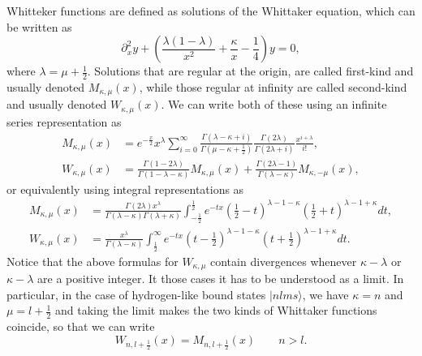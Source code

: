 Whitteker functions are defined as solutions of the Whittaker equation, which can be written as~\cite{bams}
\begin{equation}
    \partial_x^2 y + \left(\frac{\lambda(1-\lambda)}{x^2}+\frac{\kappa}{x}-\frac{1}{4}\right) y = 0,
\end{equation}
where $\lambda = \mu+\frac{1}{2}$.
Solutions that are regular at the origin, are called first-kind and usually denoted $M_{\kappa,\mu}(x)$, while those regular at infinity are called second-kind and usually denoted $W_{\kappa,\mu}(x)$. We can write both of these using an infinite series representation as
\begin{subequations} \label{WhittakerDefEq}
\begin{align}
    M_{\kappa,\mu}(x) &= e^{-\frac{x}{2}}x^{\lambda}\sum_{i=0}^\infty\frac{\Gamma(\lambda-\kappa+i)}{\Gamma(\mu-\kappa+\frac{1}{2})}\frac{\Gamma(2\lambda)}{\Gamma(2\lambda+i)}\frac{x^{i+\lambda}}{i!},
    \\
    W_{\kappa,\mu}(x) &= \frac{\Gamma(1-2\lambda)}{\Gamma(1-\lambda-\kappa)}M_{\kappa,\mu}(x)+\frac{\Gamma(2\lambda-1)}{\Gamma(\lambda-\kappa)}M_{\kappa,-\mu}(x),
\end{align}
\end{subequations}
or equivalently using integral representations as~\cite{AS}
\begin{subequations}
\begin{align}
    M_{\kappa,\mu}(x) &= \frac{\Gamma(2\lambda)x^{\lambda}}{\Gamma(\lambda-\kappa)\Gamma(\lambda+\kappa)}\int_{-\frac{1}{2}}^{\frac{1}{2}}e^{-t x}\left(\frac{1}{2}-t\right)^{\lambda-1-\kappa}\left(\frac{1}{2}+t\right)^{\lambda-1+\kappa} dt,
    \\
    W_{\kappa,\mu}(x) &= \frac{x^{\lambda}}{\Gamma(\lambda-\kappa)}\int_{\frac{1}{2}}^{\infty}e^{-t x}\left(t-\frac{1}{2}\right)^{\lambda-1-\kappa}\left(t+\frac{1}{2}\right)^{\lambda-1+\kappa}dt.
\end{align}
\end{subequations}
Notice that the above formulas for $W_{\kappa,\mu}$ contain divergences whenever $\kappa-\lambda$ or $\kappa-\lambda$ are a positive integer. It those cases it has to be understood as a limit. In particular, in the case of hydrogen-like bound states $|nlms\rangle$, we have $\kappa=n$ and $\mu=l+\frac{1}{2}$ and taking the limit makes the two kinds of Whittaker functions coincide, so that we can write 
\begin{equation}
    W_{n,l+\frac{1}{2}}(x) =  M_{n,l+\frac{1}{2}}(x) \qquad n>l.
\end{equation}
